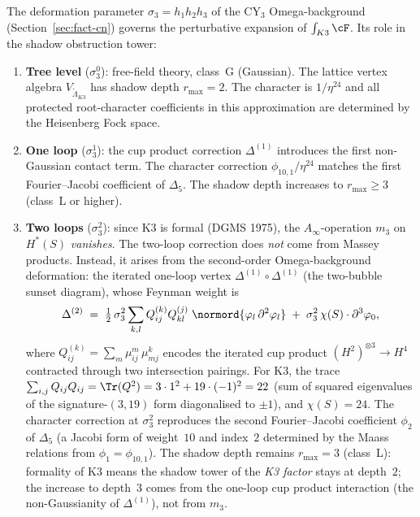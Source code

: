The deformation parameter $\sigma_3 = h_1 h_2 h_3$ of the
CY$_3$ Omega-background (Section~\ref{sec:fact-cn}) governs
the perturbative expansion of $\int_{K3} \cF$. Its role in
the shadow obstruction tower:

\begin{enumerate}[label=(\roman*)]
\item \textbf{Tree level} ($\sigma_3^0$): free-field theory,
 class~G (Gaussian). The lattice vertex algebra
 $V_{\widetilde{\Lambda}_{K3}}$ has shadow depth $r_{\max} = 2$.
 The character is $1/\eta^{24}$ and all protected root-character
 coefficients in this approximation are determined by the Heisenberg
 Fock space.

\item \textbf{One loop} ($\sigma_3^1$): the cup product
 correction $\Delta^{(1)}$ introduces the first non-Gaussian
 contact term. The character correction
 $\phi_{10,1}/\eta^{24}$ matches the first Fourier--Jacobi
 coefficient of $\Delta_5$. The shadow depth increases to
 $r_{\max} \geq 3$ (class~L or higher).

\item \textbf{Two loops} ($\sigma_3^2$): since K3 is formal
 (DGMS 1975), the $A_\infty$-operation $m_3$ on $H^*(S)$
 \emph{vanishes}. The two-loop correction does \emph{not}
 come from Massey products. Instead, it arises from the
 second-order Omega-background deformation: the iterated
 one-loop vertex $\Delta^{(1)} \circ \Delta^{(1)}$
 (the two-bubble sunset diagram), whose Feynman weight is
 \begin{equation}\label{eq:two-loop-vertex}
 \Delta^{(2)}
 \;=\;
 \tfrac{1}{2}\, \sigma_3^2
 \sum_{k,l} Q_{ij}^{(k)} Q_{kl}^{(j)}\;
 \normord{\varphi_l\, \partial^2\varphi_l}
 \;+\;
 \sigma_3^2\, \chi(S) \cdot \partial^3\varphi_0,
 \end{equation}
 where $Q_{ij}^{(k)} = \sum_m \mu^m_{ij}\,\mu^k_{mj}$
 encodes the iterated cup product $(H^2)^{\otimes 3} \to H^4$
 contracted through two intersection pairings.
 For K3, the trace
 $\sum_{i,j} Q_{ij} Q_{ij} = \Tr(Q^2) = 3 \cdot 1^2 + 19 \cdot (-1)^2 = 22$
 (sum of squared eigenvalues of the signature-$(3,19)$ form
 diagonalised to $\pm 1$), and $\chi(S) = 24$.
 The character correction at $\sigma_3^2$ reproduces
 the second Fourier--Jacobi coefficient $\phi_2$ of $\Delta_5$
 (a Jacobi form of weight~$10$ and index~$2$ determined by the
 Maass relations from $\phi_1 = \phi_{10,1}$).
 The shadow depth remains $r_{\max} = 3$ (class~L):
 formality of K3 means the shadow tower of the
 \emph{K3 factor} stays at depth~$2$; the increase to
 depth~$3$ comes from the one-loop cup product interaction
 (the non-Gaussianity of $\Delta^{(1)}$), not from $m_3$.


\end{enumerate}
